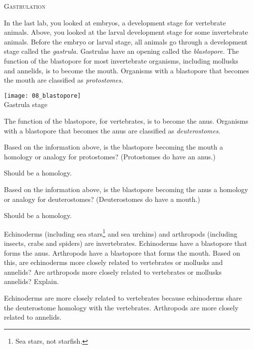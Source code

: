 \documentclass[12pt, hidelinks]{exam}
\newcommand*\AnswerBox[2]{%
    \parbox[t][#1]{0.92\textwidth}{%
    \begin{solution}#2\end{solution}}
    \vspace{\stretch{1}}
}
\begin{document}
\begin{questions}
\bigskip

\textsc{Gastrulation}

\bigskip

\begin{minipage}{0.75\textwidth}%
In the last lab, you looked at embryos, a development stage for
vertebrate animals. Above, you looked at the larval development
stage for some invertebrate animals. Before the embryo or larval stage, all 
animals go through a development stage called the \emph{gastrula.}  
Gastrulas have an opening called the \emph{blastopore.} The function of the blastopore 
 for most invertebrate organisms, including mollusks and annelids, is to become the mouth.
 Organisms with a blastopore that
 becomes the mouth are classified as \emph{protostomes.} 
\end{minipage}\hfill
\begin{minipage}{0.25\textwidth}%
\centering\texttt{[image: 08\_blastopore]}\\%
{\footnotesize Gastrula stage}%
\end{minipage}

The function of the blastopore, for vertebrates, is to become the anus.  Organisms with a blastopore that becomes
the anus are classified as \emph{deuterostomes}. 

\question
Based on the information above, is the blastopore becoming the mouth a 
homology or analogy for protostomes? (Protostomes do have an anus.)

\AnswerBox{3\baselineskip}{Should be a homology.}

\question
Based on the information above, is the blastopore becoming the anus a 
homology or analogy for deuterostomes? (Deuterostomes do have a mouth.)

\AnswerBox{3\baselineskip}{Should be a homology.}

\question
Echinoderms (including sea stars\footnote{Sea stars, not starfish.} and sea urchins) 
and arthropods (including insects, crabs and spiders) are invertebrates. 
Echinoderms have a blastopore that forms the anus. 
Arthropods have a blastopore that forms the mouth.
Based on this, are echinoderms more closely related to vertebrates
or mollusks and annelids? Are arthropods more closely related to vertebrates or mollusks 
annelids? Explain.

\AnswerBox{4\baselineskip}{Echinoderms are more closely related to vertebrates because
echinoderms share the deuterostome homology with the vertebrates. Arthropods are more closely related to annelids.}


\end{questions}
\end{document}
